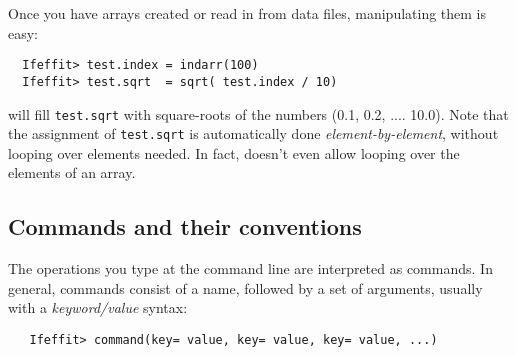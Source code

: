\documentclass[11pt]{article}
\begin{document}
Once you have arrays created or read in from data files, manipulating them
is easy:
{\small\begin{verbatim}
  Ifeffit> test.index = indarr(100)
  Ifeffit> test.sqrt  = sqrt( test.index / 10)
\end{verbatim}}\noindent
will fill {\tt{test.sqrt}} with square-roots of the numbers (0.1, 0.2, ....
10.0).  Note that the assignment of {\tt{test.sqrt}} is automatically done
{\emph{element-by-element}}, without looping over elements needed.  In
fact, {\ifeffit} doesn't even allow looping over the elements of an array.


\subsection{Commands and their conventions}
\label{s:datatypes:commands}

The operations you type at the {\ifeffit} command line are interpreted as
commands. In general, {\ifeffit} commands consist of a name, followed by a
set of arguments, usually with a {\emph{keyword/value}} syntax:
{\small\begin{verbatim}
   Ifeffit> command(key= value, key= value, key= value, ...)
\end{verbatim}}
\noindent
\end{document}
